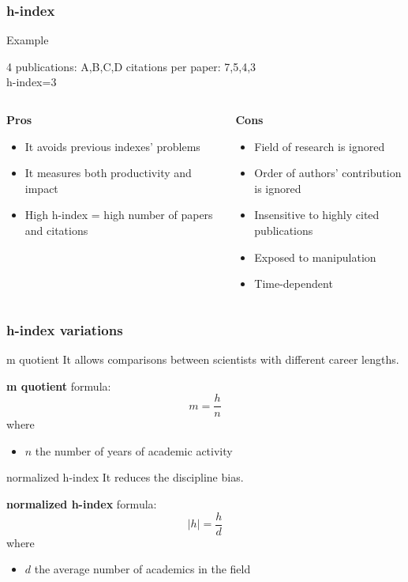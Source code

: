 \documentclass{beamer}
\newcommand{\pros}{\item[{\textcolor[HTML]{3C8031}{\ding{51}}}]}
\newcommand{\cons}{\item[\textcolor{red}{\ding{54}}]}
\begin{document}
\begin{frame}
    \frametitle{h-index}

    \begin{exampleblock}{Example}
        \begin{center}
            4 publications:   A,B,C,D \hspace{0.5cm}
            citations per paper:  7,5,4,3\\
            h-index=3
        \end{center}
    \end{exampleblock}

    \begin{columns}[T]
        \begin{column}{.5\textwidth}
            \centering \textbf{Pros}
            \begin{itemize}[<+->]
                \pros It avoids previous indexes' problems
                \pros It measures both productivity and impact
                \pros High h-index = high number of papers and citations
            \end{itemize}
        \end{column}
        \begin{column}{.5\textwidth}
            \centering \textbf{Cons}
            \begin{itemize}[<+->]
                \cons Field of research is ignored
                \cons Order of authors' contribution is ignored
                \cons Insensitive to highly cited publications
                \cons Exposed to manipulation
                \cons Time-dependent
            \end{itemize}
        \end{column}
    \end{columns}
\end{frame}

\begin{frame}
    \frametitle{h-index variations}
    \begin{block}{m quotient}
        It allows comparisons between scientists with different career lengths.
    \end{block}

    \textbf{m quotient} formula:
    \[
        m = \frac{h}{n}
    \]
    where
    \begin{itemize}
        \item $n$ the number of years of academic activity
    \end{itemize}

    \begin{block}{normalized h-index}
        It reduces the discipline bias.
    \end{block}

    \textbf{normalized h-index} formula:
    \[
        |h|=\frac{h}{d}
    \]
    where
    \begin{itemize}
        \item $d$ the average number of academics in the field
    \end{itemize}
\end{frame}
\end{document}
